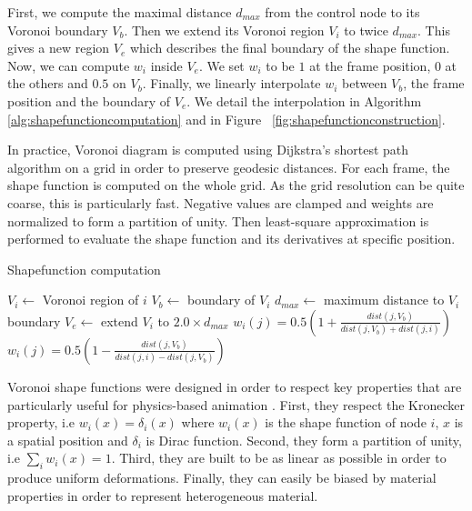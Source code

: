 First, we compute the maximal distance $d_{max}$ from the control node to its Voronoi boundary $V_{b}$. Then we extend its Voronoi region $V_{i}$ to twice $d_{max}$. This gives a new region $V_{e}$ which describes the final boundary of the shape function. Now, we can compute $w_{i}$ inside $V_{e}$. We set $w_{i}$ to be $1$ at the frame position, $0$ at the others and $0.5$ on $V_{b}$. Finally, we linearly interpolate $w_{i}$ between $V_{b}$, the frame position and the boundary of $V_{e}$. We detail the interpolation in Algorithm~ \ref{alg:shapefunctioncomputation} and in Figure~ \ref{fig:shapefunctionconstruction}.

In practice, Voronoi diagram is computed using Dijkstra's shortest path algorithm on a grid in order to preserve geodesic distances. For each frame, the shape function is computed on the whole grid. As the grid resolution can be quite coarse, this is particularly fast. Negative values are clamped and weights are normalized to form a partition of unity. Then least-square approximation is performed to evaluate the shape function and its derivatives at specific position.

\begin{algorithm}[h]
\caption[Frame-based cutting: Shapefunction computation]{\label{alg:shapefunctioncomputation}Shapefunction computation}
\begin{algorithmic}[1]
	\State $V_{i} \gets$ Voronoi region of $i$
	\State $V_{b} \gets$ boundary of $V_{i}$	
	\State $d_{max} \gets$ maximum distance to $V_{i}$ boundary
	\State $V_{e} \gets$ extend $V_{i}$ to $2.0 \times d_{max}$
	\State $\displaystyle w_{i}(j) = 0.5\left(1 + \frac{dist(j,V_{b})}{dist(j,V_{b})+dist(j,i)}\right)$
		\State $\displaystyle w_{i}(j) = 0.5\left(1 - \frac{dist(j,V_{b})}{dist(j,i)-dist(j,V_{b})}\right)$
	\EndIf
	\EndFor
\EndFor
\EndProcedure
\end{algorithmic}
\end{algorithm}

Voronoi shape functions were designed in order to respect key properties that are particularly useful for physics-based animation \cite{Faure2011} . First, they respect the Kronecker property, i.e $w_{i}(x) = \delta_{i}(x)$ where $w_{i}(x)$ is the shape function of node $i$, $x$ is a spatial position and $\delta_{i}$ is Dirac function. Second, they form a partition of unity, i.e $\sum_{i}w_{i}(x) = 1$. Third, they are built to be as linear as possible in order to produce uniform deformations. Finally, they can easily be biased by material properties in order to represent heterogeneous material.

